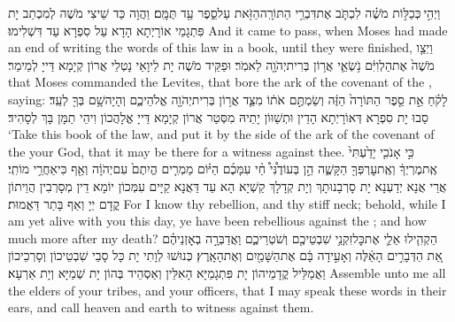 {וַיְהִ֣י \legarmeh  כְּכַלּ֣וֹת מֹשֶׁ֗ה לִכְתֹּ֛ב אֶת\maqqaf דִּבְרֵ֥י הַתּוֹרָֽה\maqqaf הַזֹּ֖את עַל\maqqaf סֵ֑פֶר עַ֖ד תֻּמָּֽם׃}
{וַהֲוָה כַּד שֵׁיצִי מֹשֶׁה לְמִכְתַב יָת פִּתְגָמֵי אוֹרָיְתָא הָדָא עַל סִפְרָא עַד דִּשְׁלִימוּ׃}
{And it came to pass, when Moses had made an end of writing the words of this law in a book, until they were finished,}{}
{וַיְצַ֤ו מֹשֶׁה֙ אֶת\maqqaf הַלְוִיִּ֔ם נֹ֥שְׂאֵ֛י אֲר֥וֹן בְּרִית\maqqaf יְהֹוָ֖ה לֵאמֹֽר׃}
{וּפַקֵּיד מֹשֶׁה יָת לֵיוָאֵי נָטְלֵי אֲרוֹן קְיָמָא דַּייָ לְמֵימַר׃}
{that Moses commanded the Levites, that bore the ark of the covenant of the \lord, saying:}{}
{לָקֹ֗חַ אֵ֣ת סֵ֤פֶר הַתּוֹרָה֙ הַזֶּ֔ה וְשַׂמְתֶּ֣ם אֹת֔וֹ מִצַּ֛ד אֲר֥וֹן בְּרִית\maqqaf יְהֹוָ֖ה אֱלֹהֵיכֶ֑ם וְהָיָה\maqqaf שָׁ֥ם בְּךָ֖ לְעֵֽד׃}
{סַבוּ יָת סִפְרָא דְּאוֹרָיְתָא הָדֵין וּתְשַׁוּוֹן יָתֵיהּ מִסְּטַר אֲרוֹן קְיָמָא דַּייָ אֱלָהֲכוֹן וִיהֵי תַמָּן בָּךְ לְסָהִיד׃}
{‘Take this book of the law, and put it by the side of the ark of the covenant of the \lord\space your God, that it may be there for a witness against thee.}{}
{כִּ֣י אָנֹכִ֤י יָדַ֙עְתִּי֙ אֶֽת\maqqaf מֶרְיְךָ֔ וְאֶֽת\maqqaf עׇרְפְּךָ֖ הַקָּשֶׁ֑ה הֵ֣ן בְּעוֹדֶ֩נִּי֩ חַ֨י עִמָּכֶ֜ם הַיּ֗וֹם מַמְרִ֤ים הֱיִתֶם֙ עִם\maqqaf יְהֹוָ֔ה וְאַ֖ף כִּי\maqqaf אַחֲרֵ֥י מוֹתִֽי׃}
{אֲרֵי אֲנָא יְדַעְנָא יָת סָרְבָנוּתָךְ וְיָת קְדָלָךְ קַשְׁיָא הָא עַד דַּאֲנָא קַיָּים עִמְּכוֹן יוֹמָא דֵין מְסָרְבִין הֲוֵיתוֹן קֳדָם יְיָ וְאַף בָּתַר דַּאֲמוּת׃}
{For I know thy rebellion, and thy stiff neck; behold, while I am yet alive with you this day, ye have been rebellious against the \lord; and how much more after my death?}{}
{הַקְהִ֧ילוּ אֵלַ֛י אֶת\maqqaf כׇּל\maqqaf זִקְנֵ֥י שִׁבְטֵיכֶ֖ם וְשֹׁטְרֵיכֶ֑ם וַאֲדַבְּרָ֣ה בְאׇזְנֵיהֶ֗ם אֵ֚ת הַדְּבָרִ֣ים הָאֵ֔לֶּה וְאָעִ֣ידָה בָּ֔ם אֶת\maqqaf הַשָּׁמַ֖יִם וְאֶת\maqqaf הָאָֽרֶץ׃}
{כְּנוּשׁוּ לְוָתִי יָת כָּל סָבֵי שִׁבְטֵיכוֹן וְסָרְכֵיכוֹן וַאֲמַלֵּיל קֳדָמֵיהוֹן יָת פִּתְגָמַיָּא הָאִלֵּין וְאַסְהֵיד בְּהוֹן יָת שְׁמַיָּא וְיָת אַרְעָא׃}
{Assemble unto me all the elders of your tribes, and your officers, that I may speak these words in their ears, and call heaven and earth to witness against them.}{}
